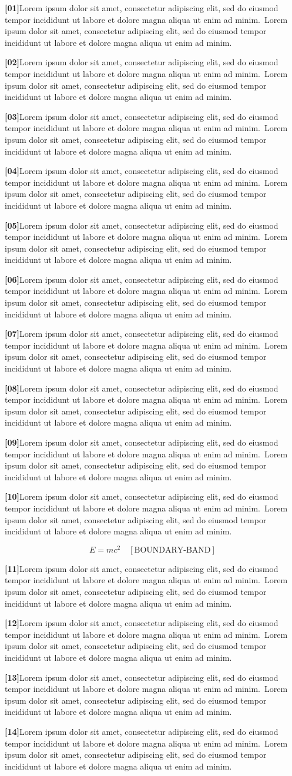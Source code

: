 \documentclass[twocolumn]{article}
\newcommand\Body{Lorem ipsum dolor sit amet, consectetur adipiscing elit, sed do
eiusmod tempor incididunt ut labore et dolore magna aliqua ut enim ad minim.}
\newcommand\Par[1]{\par\noindent\textbf{[#1]}\space\Body\ \Body\par\medskip}
\begin{document}
\Par{01}\Par{02}\Par{03}\Par{04}\Par{05}\Par{06}\Par{07}\Par{08}\Par{09}\Par{10}
\begin{wideband}\[ E=mc^2 \quad[\text{BOUNDARY-BAND}] \]\end{wideband}
\Par{11}\Par{12}\Par{13}\Par{14}
\end{document}
